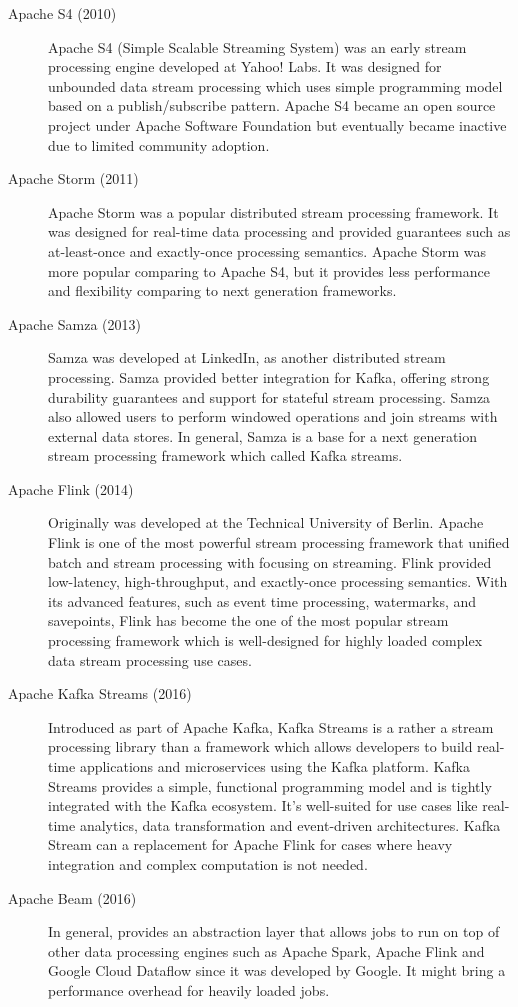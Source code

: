 \begin{description}
    \item[Apache S4 (2010)]  Apache S4 (Simple Scalable Streaming System) was an early stream
    processing engine developed at Yahoo! Labs.
    It was designed for unbounded data stream processing which uses
    simple programming model based on a publish/subscribe pattern.
    Apache S4 became an open source project under Apache Software Foundation but
    eventually became inactive due to limited community adoption.
    \item[Apache Storm (2011)]
    Apache Storm was a popular distributed stream processing framework.
    It was designed for real-time data processing and provided guarantees such as
    at-least-once and exactly-once processing semantics.
    Apache Storm was more popular comparing to Apache S4, but it provides less
    performance and flexibility comparing to next generation frameworks.
    \item[Apache Samza (2013)] Samza was developed at LinkedIn, as another distributed stream processing.
    Samza provided better integration for Kafka,
    offering strong durability guarantees and support for stateful stream processing.
    Samza also allowed users to perform windowed operations and join streams with external data stores.
    In general, Samza is a base for a next generation stream processing framework which called Kafka streams.
    \item[Apache Flink (2014)] Originally was developed at the Technical University of Berlin.
    Apache Flink is one of the most powerful stream processing framework that unified batch and
    stream processing with focusing on streaming.
    Flink provided low-latency, high-throughput, and exactly-once processing semantics.
    With its advanced features, such as event time processing, watermarks, and savepoints,
    Flink has become the one of the most popular stream processing framework which is
    well-designed for highly loaded complex data stream processing use cases.
    \item[Apache Kafka Streams (2016)] Introduced as part of Apache Kafka, Kafka Streams
    is a rather a stream processing library than a framework which allows developers to build real-time
    applications and microservices using the Kafka platform.
    Kafka Streams provides a simple, functional programming model and is tightly
    integrated with the Kafka ecosystem.
    It's well-suited for use cases like real-time analytics, data transformation
    and event-driven architectures.
    Kafka Stream can a replacement for Apache Flink for cases where heavy integration
    and complex computation is not needed.
    \item[Apache Beam (2016)] In general, provides an abstraction layer that allows
    jobs to run on top of other data processing engines such as Apache Spark, Apache Flink and
    Google Cloud Dataflow since it was developed by Google.
    It might bring a performance overhead for heavily loaded jobs.
\end{description}

